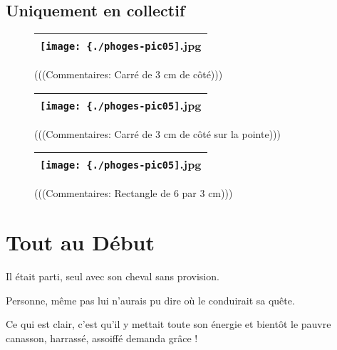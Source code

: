 \documentclass[12pt,twocolumn,french]{article}
\begin{document}
\subsection{Uniquement en collectif}
%
  \begin{figure}[H]
    \label{phoges-pic05.jpg}
    \noindent \centering{}
    \begin{tabular}{|c|}
      \hline
          \texttt{[image: \{./phoges-pic05]}.jpg}
        \tabularnewline \hline
    \end{tabular}
    \vspace{2mm}
    \caption{
      (((Commentaires: Carré de 3 cm de côté)))
    }
  \end{figure}
  \begin{figure}[H]
    \label{phoges-pic05.jpg}
    \noindent \centering{}
    \begin{tabular}{|c|}
      \hline
          \texttt{[image: \{./phoges-pic05]}.jpg}
        \tabularnewline \hline
    \end{tabular}
    \vspace{2mm}
    \caption{
      (((Commentaires: Carré de 3 cm de côté sur la pointe)))
    }
  \end{figure}
  \begin{figure}[H]
    \label{phoges-pic05.jpg}
    \noindent \centering{}
    \begin{tabular}{|c|}
      \hline
          \texttt{[image: \{./phoges-pic05]}.jpg}
        \tabularnewline \hline
    \end{tabular}
    \vspace{2mm}
    \caption{
      (((Commentaires: Rectangle de 6 par 3 cm)))
    }
  \end{figure}
\clearpage
%
\section{Tout au Début}
%

Il était parti, seul avec son cheval sans provision.

Personne, même pas lui n'aurais pu dire où le conduirait sa quête.

Ce qui est clair, c'est qu'il y mettait toute son énergie et bientôt le pauvre canasson, harrassé, assoiffé demanda grâce !
\end{document}

